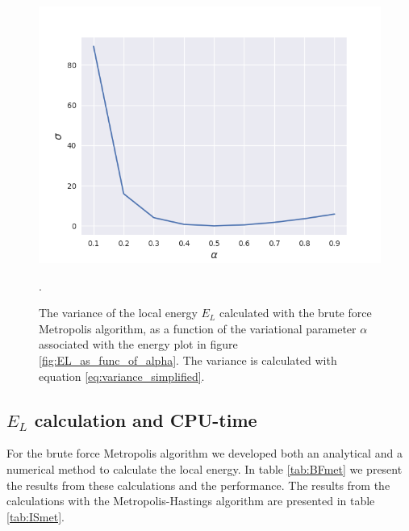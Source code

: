 \documentclass[norsk,a4paper,12pt]{article}
\begin{document}
\begin{figure} [H]
	\centering
	\includegraphics[scale=0.6]{images/variance.png}
	\caption{The variance of the local energy $E_L$ calculated with the brute force Metropolis algorithm, as a function of the variational parameter $\alpha$ associated with the energy plot in figure \ref{fig:EL_as_func_of_alpha}. The variance is calculated with equation \ref{eq:variance_simplified}.}.
	\label{fig:variance_EL_as_func_of_alpha}
\end{figure} 

\subsection{$E_L$ calculation and CPU-time}\label{CPU}
For the brute force Metropolis algorithm we developed both an analytical and a numerical method to calculate the local energy. In table \ref{tab:BFmet} we present the results from these calculations and the performance. The results from the calculations with the Metropolis-Hastings algorithm are presented in table \ref{tab:ISmet}.
\end{document}
